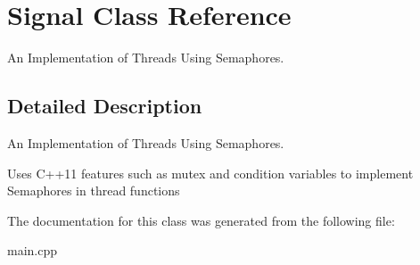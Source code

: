 \hypertarget{classSignal}{}\section{Signal Class Reference}
\label{classSignal}


An Implementation of Threads Using Semaphores.  




\subsection{Detailed Description}
An Implementation of Threads Using Semaphores. 

Uses C++11 features such as mutex and condition variables to implement Semaphores in thread functions 

The documentation for this class was generated from the following file\+:\begin{DoxyCompactItemize}
\item 
main.\+cpp\end{DoxyCompactItemize}
